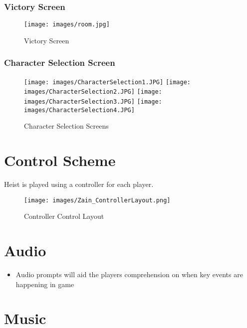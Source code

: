 \documentclass[10pt]{report}
\begin{document}
\subsubsection{Victory Screen}

\begin{figure}[H]
    \centering
    \texttt{[image: images/room.jpg]}
    \caption{Victory Screen}
    \label{fig:victory}
\end{figure}

\subsubsection{Character Selection Screen}

\begin{figure}[H]
    \centering
    \texttt{[image: images/CharacterSelection1.JPG]}
    \texttt{[image: images/CharacterSelection2.JPG]}
    \texttt{[image: images/CharacterSelection3.JPG]}
    \texttt{[image: images/CharacterSelection4.JPG]}
    \caption{Character Selection Screens}
    \label{fig:charSelect}
\end{figure}

\section{Control Scheme}

Heist is played using a controller for each player.

\begin{figure}[H]
    \centering
	\texttt{[image: images/Zain\_ControllerLayout.png]}
    \caption{Controller Control Layout}
\end{figure}

\section{Audio}

\begin{itemize}
    \item Audio prompts will aid the players comprehension on when key events are happening in game
\end{itemize}

\section{Music}
\end{document}
